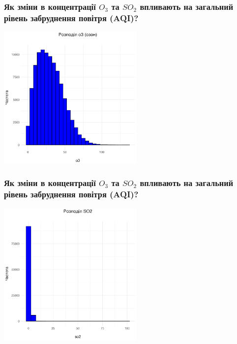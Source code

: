 \documentclass{beamer}
\begin{document}
\begin{frame}
  \frametitle{Як зміни в концентрації $O_3$ та $SO_2$ впливають на загальний рівень забруднення повітря (AQI)?}

  \begin{center}
    \includegraphics[height=2.8in]{plots/question2/o3_plot.png}
  \end{center}
\end{frame}

\begin{frame}
  \frametitle{Як зміни в концентрації $O_3$ та $SO_2$ впливають на загальний рівень забруднення повітря (AQI)?}

  \begin{center}
    \includegraphics[height=2.8in]{plots/question2/so2_plot.png}
  \end{center}
\end{frame}
\end{document}
